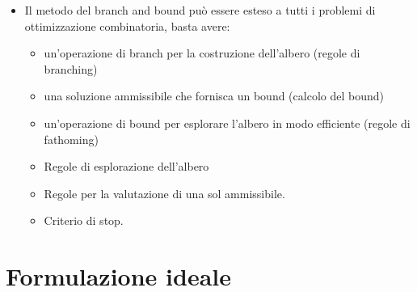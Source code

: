 \begin{itemize}
\begin{itemize}
	\end{itemize}
	\item Il metodo del branch and bound può essere esteso a tutti i problemi di ottimizzazione combinatoria, basta avere:
	\begin{itemize}
		\item un'operazione di branch per la costruzione dell'albero (regole di branching)
		\item una soluzione ammissibile che fornisca un bound (calcolo del bound)
		\item un'operazione di bound per esplorare l'albero in modo efficiente (regole di fathoming)
		\item Regole di esplorazione dell'albero
		\item Regole per la valutazione di una sol ammissibile.
		\item Criterio di stop.
	\end{itemize}
\end{itemize}

\section{Formulazione ideale}

